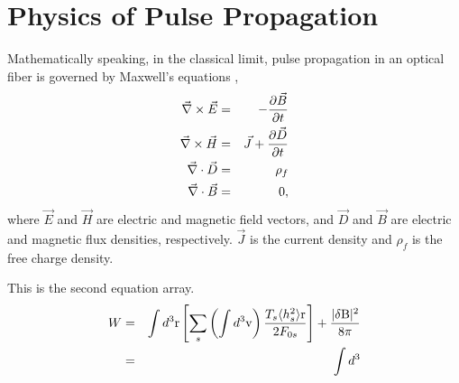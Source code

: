 \section{Physics of Pulse Propagation}

Mathematically speaking, in the classical limit, pulse propagation in an
optical fiber is governed by Maxwell's equations \cite{Agrawal2,Diament},
\begin{eqnarray}
\vec{\nabla}\times\vec{E} & = &- {\partial \vec{B} \over \partial t} \nonumber\\
\vec{\nabla}\times\vec{H} & = & \vec{J}+ {\partial \vec{D} \over \partial t}
\nonumber\\
\vec{\nabla}\cdot\vec{D} & = & \rho_{f} \nonumber\\
\vec{\nabla}\cdot\vec{B} & = & 0 ,
\end{eqnarray}
where $\vec{E}$ and $\vec{H}$ are electric and magnetic field
vectors, and
$\vec{D}$ and $\vec{B}$ are electric and magnetic flux densities,
respectively. $\vec{J}$ is the current density and $\rho_{f}$ is the free
charge density.

This is the second equation array.
\begin{eqnarray}
W & = & \int d^3{\rm r} \left[ \sum_s \left( \int d^3{\rm v} \right){T_{s} \langle h^2_s \rangle {\rm r} \over 2F_{0s}} \right] + {|\delta \rm B|^2 \over 8\pi} \nonumber \\
& = & \int d^3
\end{eqnarray}

